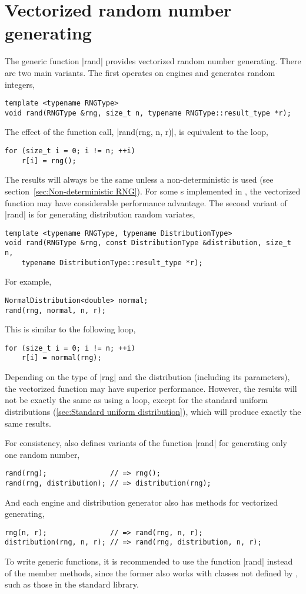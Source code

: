 \section{Vectorized random number generating}
\label{sec:Vectorized random number generating}

The generic function |rand| provides vectorized random number generating. There
are two main variants. The first operates on \rng engines and generates random
integers,
\begin{verbatim}
template <typename RNGType>
void rand(RNGType &rng, size_t n, typename RNGType::result_type *r);
\end{verbatim}
The effect of the function call, |rand(rng, n, r)|, is equivalent to the loop,
\begin{verbatim}
for (size_t i = 0; i != n; ++i)
    r[i] = rng();
\end{verbatim}
The results will always be the same unless a non-deterministic \rng is used
(see section~\ref{sec:Non-deterministic RNG}). For some \rng{}s implemented in
\mckl, the vectorized function may have considerable performance advantage. The
second variant of |rand| is for generating distribution random variates,
\begin{verbatim}
template <typename RNGType, typename DistributionType>
void rand(RNGType &rng, const DistributionType &distribution, size_t n,
    typename DistributionType::result_type *r);
\end{verbatim}
For example,
\begin{verbatim}
NormalDistribution<double> normal;
rand(rng, normal, n, r);
\end{verbatim}
This is similar to the following loop,
\begin{verbatim}
for (size_t i = 0; i != n; ++i)
    r[i] = normal(rng);
\end{verbatim}
Depending on the type of |rng| and the distribution (including its parameters),
the vectorized function may have superior performance. However, the results
will not be exactly the same as using a loop, except for the standard uniform
distributions (\ref{sec:Standard uniform distribution}), which will produce
exactly the same results.

For consistency, \mckl also defines variants of the function |rand| for
generating only one random number,
\begin{verbatim}
rand(rng);               // => rng();
rand(rng, distribution); // => distribution(rng);
\end{verbatim}
And each \rng engine and distribution generator also has methods for vectorized
generating,
\begin{verbatim}
rng(n, r);               // => rand(rng, n, r);
distribution(rng, n, r); // => rand(rng, distribution, n, r);
\end{verbatim}
To write generic functions, it is recommended to use the function |rand|
instead of the member methods, since the former also works with classes not
defined by \mckl, such as those in the standard library.

